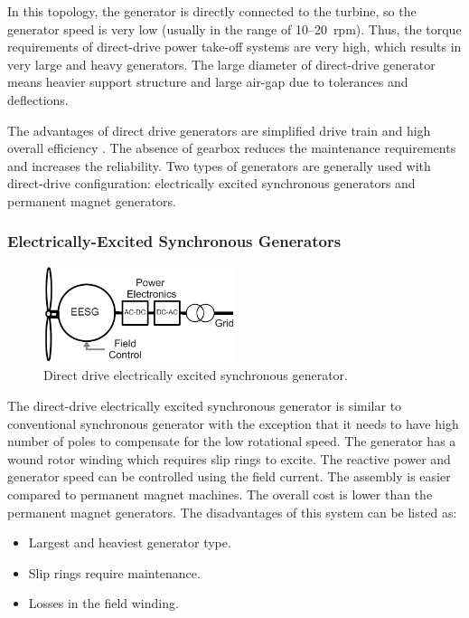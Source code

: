 \documentclass[a4paper, 11pt]{article} %
\begin{document}
In this topology, the generator is directly connected to the turbine, so the generator speed is very low (usually in the range of 10--20~rpm). Thus, the torque requirements of direct-drive power take-off systems are very high, which results in very large and heavy generators. The large diameter of direct-drive generator means heavier support structure and large air-gap due to tolerances and deflections.

The advantages of direct drive generators are simplified drive train and high overall efficiency \cite{Li2008a}. The absence of gearbox reduces the maintenance requirements and increases the reliability. Two types of generators are generally used with direct-drive configuration: electrically excited synchronous generators and permanent magnet generators. 

\subsubsection{Electrically-Excited Synchronous Generators}

  \begin{figure}
    \centering
    \includegraphics[width=0.5\textwidth]{EESG}
    \caption{Direct drive electrically excited synchronous generator.} 
    \label{eesg}
  \end{figure}

The direct-drive electrically excited synchronous generator is similar to conventional synchronous generator with the exception that it needs to have high number of poles to compensate for the low rotational speed. The generator has a wound rotor winding which requires slip rings to excite. The reactive power and generator speed can be controlled using the field current. The assembly is easier compared to permanent magnet machines. The overall cost is lower than the permanent magnet generators. The disadvantages of this system can be listed as:

\begin{itemize}
	\item Largest and heaviest generator type.
	\item Slip rings require maintenance.
	\item Losses in the field winding.
\end{itemize}
\end{document}
